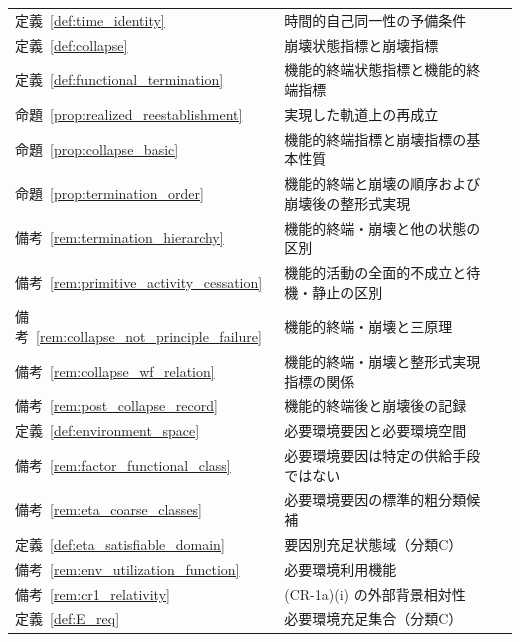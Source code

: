 \begin{longtable}{p{2.4cm} p{10.4cm} r}
定義~\ref{def:time_identity} & 時間的自己同一性の予備条件 & \pageref{def:time_identity} \\
定義~\ref{def:collapse} & 崩壊状態指標と崩壊指標 & \pageref{def:collapse} \\
定義~\ref{def:functional_termination} & 機能的終端状態指標と機能的終端指標 & \pageref{def:functional_termination} \\
命題~\ref{prop:realized_reestablishment} & 実現した軌道上の再成立 & \pageref{prop:realized_reestablishment} \\
命題~\ref{prop:collapse_basic} & 機能的終端指標と崩壊指標の基本性質 & \pageref{prop:collapse_basic} \\
命題~\ref{prop:termination_order} & 機能的終端と崩壊の順序および崩壊後の整形式実現 & \pageref{prop:termination_order} \\
備考~\ref{rem:termination_hierarchy} & 機能的終端・崩壊と他の状態の区別 & \pageref{rem:termination_hierarchy} \\
備考~\ref{rem:primitive_activity_cessation} & 機能的活動の全面的不成立と待機・静止の区別 & \pageref{rem:primitive_activity_cessation} \\
備考~\ref{rem:collapse_not_principle_failure} & 機能的終端・崩壊と三原理 & \pageref{rem:collapse_not_principle_failure} \\
備考~\ref{rem:collapse_wf_relation} & 機能的終端・崩壊と整形式実現指標の関係 & \pageref{rem:collapse_wf_relation} \\
備考~\ref{rem:post_collapse_record} & 機能的終端後と崩壊後の記録 & \pageref{rem:post_collapse_record} \\
定義~\ref{def:environment_space} & 必要環境要因と必要環境空間 & \pageref{def:environment_space} \\
備考~\ref{rem:factor_functional_class} & 必要環境要因は特定の供給手段ではない & \pageref{rem:factor_functional_class} \\
備考~\ref{rem:eta_coarse_classes} & 必要環境要因の標準的粗分類候補 & \pageref{rem:eta_coarse_classes} \\
定義~\ref{def:eta_satisfiable_domain} & 要因別充足状態域（分類C） & \pageref{def:eta_satisfiable_domain} \\
備考~\ref{rem:env_utilization_function} & 必要環境利用機能 & \pageref{rem:env_utilization_function} \\
備考~\ref{rem:cr1_relativity} & (CR-1a)(i) の外部背景相対性 & \pageref{rem:cr1_relativity} \\
定義~\ref{def:E_req} & 必要環境充足集合（分類C） & \pageref{def:E_req} \\

\end{longtable}

